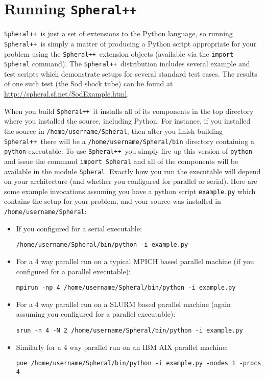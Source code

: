 \documentclass{article}
\newcommand{\Spheral}{{\tt Spheral++}}
\begin{document}
\section{Running \Spheral}
\Spheral\ is just a set of extensions to the Python language, so running
\Spheral\ is simply a matter of producing a Python script appropriate for your
problem using the \Spheral\ extension objects (available via the
\verb+import Spheral+ command).  The \Spheral\ distribution includes several
example and test scripts which demonstrate setups for several standard test
cases.  The results of one such test (the Sod shock tube) can be found
at \newline \url{http://spheral.sf.net/SodExample.html}.

When you build \Spheral\ it installs all of its components in the top directory
where you installed the source, including Python.  For instance, if you
installed the source in \verb+/home/username/Spheral+, then after you finish
building \Spheral\ there will be a \verb+/home/username/Spheral/bin+ directory
containing a \verb+python+ executable.  To use \Spheral\ you simply fire up this
version of \verb+python+ and issue the command \verb+import Spheral+ and all of
the components will be available in the module \verb+Spheral+.  Exactly how you
run the executable will depend on your architecture (and whether you configured
for parallel or serial).  Here are some example invocations assuming you have a
python script \verb+example.py+ which contains the setup for your problem, and
your source was installed in {\tt /home/username/Spheral}:
\begin{itemize}
\item If you configured for a serial executable:
\begin{verbatim}
/home/username/Spheral/bin/python -i example.py
\end{verbatim}
\item For a 4 way parallel run on a typical MPICH based parallel machine (if you
configured for a parallel executable):
\begin{verbatim}
mpirun -np 4 /home/username/Spheral/bin/python -i example.py
\end{verbatim}
\item For a 4 way parallel run on a SLURM based parallel machine (again assuming
you configured for a parallel executable):
\begin{verbatim}
srun -n 4 -N 2 /home/username/Spheral/bin/python -i example.py
\end{verbatim}
\item Similarly for a 4 way parallel run on an IBM AIX parallel machine:
\begin{verbatim}
poe /home/username/Spheral/bin/python -i example.py -nodes 1 -procs 4
\end{verbatim}
\end{itemize}
\end{document}
